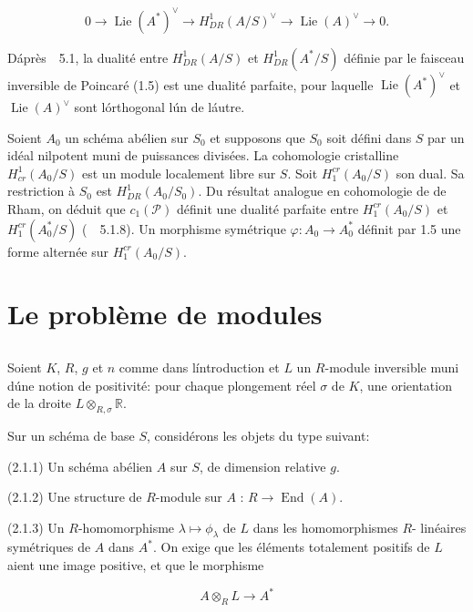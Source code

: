 \documentclass[11pt,a4paper]{article}
\theoremstyle{plain}
\theoremstyle{definition}
\DeclareMathOperator{\End}{End}
\DeclareMathOperator{\Lie}{Lie}
\begin{document}
\begin{equation}
0 \longrightarrow \Lie(A^*)^\vee \longrightarrow H^1_{DR}(A/S)^\vee \longrightarrow \Lie(A)^\vee \longrightarrow 0.
\end{equation}

D\'apr\`es~\cite{BerthelotBreenMessing}~5.1, la dualit\'e entre $H^1_{DR}(A/S)$ et $H^1_{DR}(A^*/S)$ d\'efinie par le
faisceau inversible de Poincar\'e (1.5) est une dualit\'e parfaite, pour laquelle
$\Lie(A^*)^\vee$ et $\Lie(A)^\vee$ sont l\'orthogonal l\'un de l\'autre.

Soient $A_0$ un sch\'ema ab\'elien sur $S_0$ et supposons que $S_0$ soit d\'efini dans $S$
par un id\'eal nilpotent muni de puissances divis\'ees. La cohomologie cristalline
$H^1_{cr}(A_0/S)$ est un module localement libre sur $S$. Soit $H^{cr}_1(A_0/S)$ son dual. Sa
restriction \`a $S_0$ est $H^1_{DR}(A_0/S_0)$. Du r\'esultat analogue en cohomologie de de
Rham, on d\'eduit que $c_1(\mathscr{P})$ d\'efinit une dualit\'e parfaite entre $H^{cr}_1(A_0/S)$ et
$H^{cr}_1(A^*_0/S)$ (~\cite{BerthelotBreenMessing}~5.1.8). Un morphisme sym\'etrique $\varphi: A_0 \to A^*_0$ d\'efinit par 1.5 une
forme altern\'ee sur $H^{cr}_1(A_0/S)$.

\section{Le probl\`eme de modules}

\subsection{}

Soient $K$, $R$, $g$ et $n$ comme dans l\'introduction et $L$ un $R$-module inversible
muni d\'une notion de positivit\'e: pour chaque plongement r\'eel $\sigma$ de $K$, une
orientation de la droite $L \otimes_{R,\sigma} \mathbb{R}$.

Sur un sch\'ema de base $S$, consid\'erons les objets du type suivant:

(2.1.1) Un sch\'ema ab\'elien $A$ sur $S$, de dimension relative $g$.

(2.1.2) Une structure de $R$-module sur $A$ : $R \to \End(A)$.

(2.1.3) Un $R$-homomorphisme $\lambda \mapsto \phi_\lambda$ de $L$ dans les homomorphismes $R$-
lin\'eaires sym\'etriques de $A$ dans $A^*$. On exige que les \'el\'ements totalement
positifs de $L$ aient une image positive, et que le morphisme

\begin{equation}\label{eq:2.1.3}
A \otimes_R L \longrightarrow A^*
\end{equation}
\end{document}
